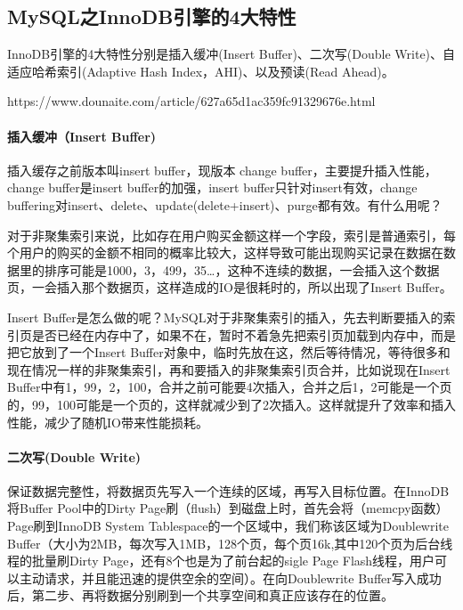 \documentclass[../../../interview-questions.tex]{subfiles}
\begin{document}
\subsection{MySQL之InnoDB引擎的4大特性}

InnoDB引擎的4大特性分别是插入缓冲(Insert Buffer)、二次写(Double Write)、自适应哈希索引(Adaptive Hash Index，AHI)、以及预读(Read Ahead)。

https://www.dounaite.com/article/627a65d1ac359fc91329676e.html

\paragraph{插入缓冲（Insert Buffer)}

插入缓存之前版本叫insert buffer，现版本 change buffer，主要提升插入性能，change buffer是insert buffer的加强，insert buffer只针对insert有效，change buffering对insert、delete、update(delete+insert)、purge都有效。有什么用呢？

对于非聚集索引来说，比如存在用户购买金额这样一个字段，索引是普通索引，每个用户的购买的金额不相同的概率比较大，这样导致可能出现购买记录在数据在数据里的排序可能是1000，3，499，35…，这种不连续的数据，一会插入这个数据页，一会插入那个数据页，这样造成的IO是很耗时的，所以出现了Insert Buffer。

Insert Buffer是怎么做的呢？MySQL对于非聚集索引的插入，先去判断要插入的索引页是否已经在内存中了，如果不在，暂时不着急先把索引页加载到内存中，而是把它放到了一个Insert Buffer对象中，临时先放在这，然后等待情况，等待很多和现在情况一样的非聚集索引，再和要插入的非聚集索引页合并，比如说现在Insert Buffer中有1，99，2，100，合并之前可能要4次插入，合并之后1，2可能是一个页的，99，100可能是一个页的，这样就减少到了2次插入。这样就提升了效率和插入性能，减少了随机IO带来性能损耗。

\paragraph{二次写(Double Write)}

保证数据完整性，将数据页先写入一个连续的区域，再写入目标位置。在InnoDB将Buffer Pool中的Dirty Page刷（flush）到磁盘上时，首先会将（memcpy函数）Page刷到InnoDB System Tablespace的一个区域中，我们称该区域为Doublewrite Buffer（大小为2MB，每次写入1MB，128个页，每个页16k,其中120个页为后台线程的批量刷Dirty Page，还有8个也是为了前台起的sigle Page Flash线程，用户可以主动请求，并且能迅速的提供空余的空间）。在向Doublewrite Buffer写入成功后，第二步、再将数据分别刷到一个共享空间和真正应该存在的位置。
\end{document}
